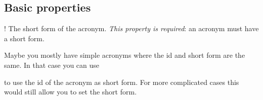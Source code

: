 \documentclass{acro-manual}
\begin{document}
\subsection{Basic properties}\label{sec:basic-properties}
\begin{properties}
  \Initial!
    The short form of the acronym.  \emph{This property is required}: an
    acronym must have a short form.
\end{properties}
Maybe you mostly have simple acronyms where the \ac{id} and short form are
the same.  In that case you can use
\begin{options}
    to use the \ac{id} of the acronym as short form. For more complicated
    cases this would still allow you to set the short form.
\end{options}
\end{document}
